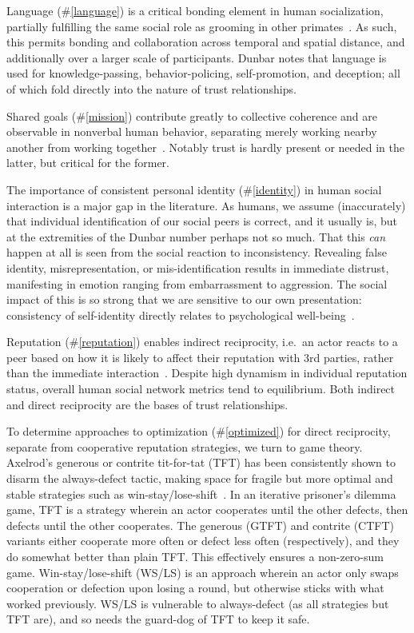 Language (\#\ref{language}) is a critical bonding element in human socialization, partially fulfilling the same social role as grooming in other primates~\cite{dunbar2004gossip}.
As such, this permits bonding and collaboration across temporal and spatial distance, and additionally over a larger scale of participants.
Dunbar notes that language is used for knowledge-passing, behavior-policing, self-promotion, and deception; all of which fold directly into the nature of trust relationships.

Shared goals (\#\ref{mission}) contribute greatly to collective coherence and are observable in nonverbal human behavior, separating merely working nearby another from working together~\cite{sacheli2015social}.
Notably trust is hardly present or needed in the latter, but critical for the former.

The importance of consistent personal identity (\#\ref{identity}) in human social interaction is a major gap in the literature.
As humans, we assume (inaccurately) that individual identification of our social peers is correct, and it usually is, but at the extremities of the Dunbar number perhaps not so much.
That this \emph{can} happen at all is seen from the social reaction to inconsistency.
Revealing false identity, misrepresentation, or mis-identification results in immediate distrust, manifesting in emotion ranging from embarrassment to aggression.
The social impact of this is so strong that we are sensitive to our own presentation: consistency of self-identity directly relates to psychological well-being~\cite{suh2002culture}.


Reputation (\#\ref{reputation}) enables indirect reciprocity, i.e.\ an actor reacts to a peer based on how it is likely to affect their reputation with 3rd parties, rather than the immediate interaction~\cite{phelps2012emergence}.
Despite high dynamism in individual reputation status, overall human social network metrics tend to equilibrium.
Both indirect and direct reciprocity are the bases of trust relationships.

To determine approaches to optimization (\#\ref{optimized}) for direct reciprocity, separate from cooperative reputation strategies, we turn to game theory.
Axelrod's generous or contrite tit-for-tat (TFT) has been consistently shown to disarm the always-defect tactic, making space for fragile but more optimal and stable strategies such as win-stay/lose-shift~\cite{axelrod1981evolution, axelrod1997complexity, nowak1995arithmetics}.
In an iterative prisoner's dilemma game, TFT is a strategy wherein an actor cooperates until the other defects, then defects until the other cooperates.
The generous (GTFT) and contrite (CTFT) variants either cooperate more often or defect less often (respectively), and they do somewhat better than plain TFT. This effectively ensures a non-zero-sum game.
Win-stay/lose-shift (WS/LS) is an approach wherein an actor only swaps cooperation or defection upon losing a round, but otherwise sticks with what worked previously.
WS/LS is vulnerable to always-defect (as all strategies but TFT are), and so needs the guard-dog of TFT to keep it safe.

